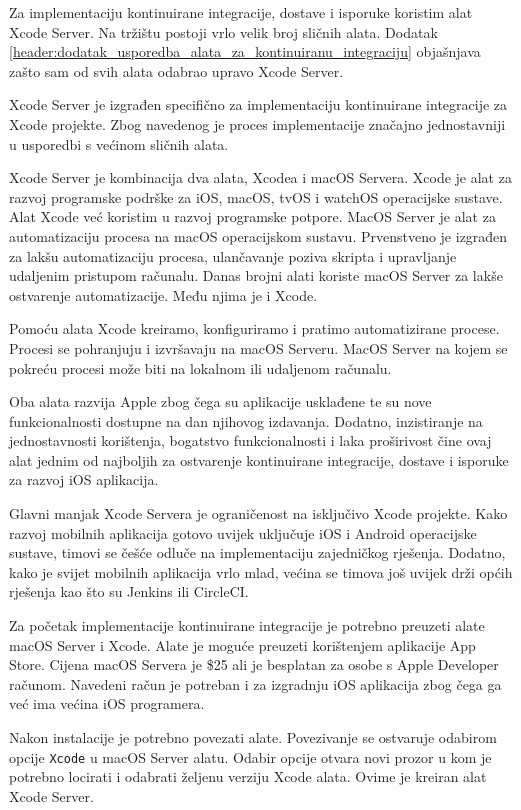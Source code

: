\documentclass[times, utf8, diplomski, numeric]{fer}
\begin{document}
Za implementaciju kontinuirane integracije, dostave i isporuke koristim alat Xcode Server. Na tržištu postoji vrlo velik broj sličnih alata. Dodatak \ref{header:dodatak_usporedba_alata_za_kontinuiranu_integraciju} objašnjava zašto sam od svih alata odabrao upravo Xcode Server.

Xcode Server je izgrađen specifično za implementaciju kontinuirane integracije za Xcode projekte. Zbog navedenog je proces implementacije značajno jednostavniji u usporedbi s većinom sličnih alata.

Xcode Server je kombinacija dva alata, Xcodea i macOS Servera. Xcode je alat za razvoj programske podrške za iOS, macOS, tvOS i watchOS operacijske sustave. Alat Xcode već koristim u razvoj programske potpore. MacOS Server je alat za automatizaciju procesa na macOS operacijskom sustavu. Prvenstveno je izgrađen za lakšu automatizaciju procesa, ulančavanje poziva skripta i upravljanje udaljenim pristupom računalu. Danas brojni alati koriste macOS Server za lakše ostvarenje automatizacije. Među njima je i Xcode.

Pomoću alata Xcode kreiramo, konfiguriramo i pratimo automatizirane procese. Procesi se pohranjuju i izvršavaju na macOS Serveru. MacOS Server na kojem se pokreću procesi može biti na lokalnom ili udaljenom računalu.

Oba alata razvija Apple zbog čega su aplikacije usklađene te su nove funkcionalnosti dostupne na dan njihovog izdavanja. Dodatno, inzistiranje na jednostavnosti korištenja, bogatstvo funkcionalnosti i laka proširivost čine ovaj alat jednim od najboljih za ostvarenje kontinuirane integracije, dostave i isporuke za razvoj iOS aplikacija.

Glavni manjak Xcode Servera je ograničenost na isključivo Xcode projekte. Kako razvoj mobilnih aplikacija gotovo uvijek uključuje iOS i Android operacijske sustave, timovi se češće odluče na implementaciju zajedničkog rješenja. Dodatno, kako je svijet mobilnih aplikacija vrlo mlad, većina se timova još uvijek drži općih rješenja kao što su Jenkins ili CircleCI.

Za početak implementacije kontinuirane integracije je potrebno preuzeti alate macOS Server i Xcode. Alate je moguće preuzeti korištenjem aplikacije App Store. Cijena macOS Servera je \$25 ali je besplatan za osobe s Apple Developer računom. Navedeni račun je potreban i za izgradnju iOS aplikacija zbog čega ga već ima većina iOS programera.

Nakon instalacije je potrebno povezati alate. Povezivanje se ostvaruje odabirom opcije \verb|Xcode| u macOS Server alatu. Odabir opcije otvara novi prozor u kom je potrebno locirati i odabrati željenu verziju Xcode alata. Ovime je kreiran alat Xcode Server.
\end{document}
